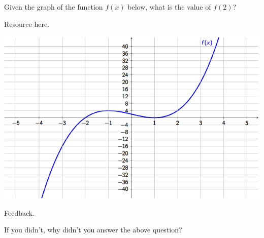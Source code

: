 \documentclass{ximera}
\begin{document}
\begin{problem} 
    Given the graph of the function $f(x)$ below, what is the value of $f(2)$?
    
    \begin{hint}
    Resource here.
    \end{hint}
    
\begin{center} \includegraphics[scale=0.7]{Graphing1.png} \end{center}
  \begin{multipleChoice}
      
      \begin{feedback}[attempt]
      Feedback.
      \end{feedback}
      
  \end{multipleChoice}
  
  If you didn't, why didn't you answer the above question?
  
  \begin{multipleChoice}
  \end{multipleChoice}
\end{problem}
\end{document}

